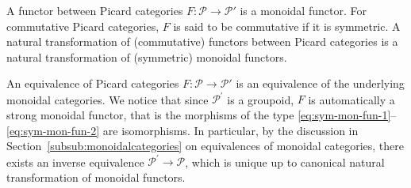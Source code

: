 \documentclass[11pt]{article}
\theoremstyle{plain}
\theoremstyle{definition}
\newcommand{\Pcal}{\mathcal P}
\begin{document}
A functor between Picard categories $F: \Pcal \to \Pcal'$ is a monoidal functor. For commutative Picard categories, $F$ is said to be commutative if it is symmetric. A natural transformation of (commutative) functors between Picard categories is a natural transformation of (symmetric) monoidal functors.

An equivalence of Picard categories $F: \Pcal \to \Pcal'$ is an equivalence of the underlying monoidal categories. We notice that since $\Pcal^{\prime}$ is a groupoid, $F$ is automatically a strong monoidal functor, that is the morphisms of the type \eqref{eq:sym-mon-fun-1}--\eqref{eq:sym-mon-fun-2} are isomorphisms. In particular, by the discussion in Section~\ref{subsub:monoidalcategories} on equivalences of monoidal categories, there exists an inverse equivalence $\Pcal^{\prime}\to\Pcal$, which is unique up to canonical natural transformation of monoidal functors.
\end{document}
